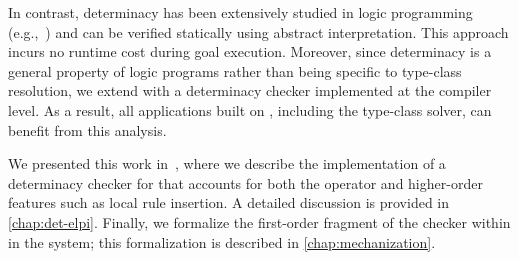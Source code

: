 In contrast, determinacy has been extensively studied in logic programming
(e.g.,~\cite{warren1989,king2005,henderson1996}) and can be verified statically
using abstract interpretation. This approach incurs no runtime cost during goal
execution. Moreover, since determinacy is a general property of logic programs
rather than being specific to type-class resolution, we extend \elpi with a
determinacy checker implemented at the compiler level. As a result, all
applications built on \elpi, including the type-class solver, can benefit from
this analysis.

We presented this work in~\cite{fissore2026}, where we describe the implementation
of a determinacy checker for \elpi that accounts for both the \cut operator and
higher-order features such as local rule insertion. A detailed discussion is
provided in \cref{chap:det-elpi}. Finally, we formalize the first-order fragment
of the checker within \elpi in the \rocq system; this formalization is described
in \cref{chap:mechanization}.%

